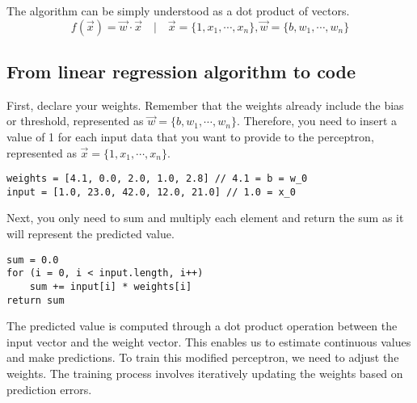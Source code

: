 The algorithm can be simply understood as a dot product of vectors.
\[
f(\vec{x}) = \vec{w} \cdot \vec{x} \quad | \quad \vec{x} = \{1, x_1, \cdots, x_n\},
\vec{w} = \{b, w_1, \cdots, w_n \}
\]

\subsection{From linear regression algorithm to code}
First, declare your weights. Remember that the weights already include the bias or threshold, represented
as $\vec{w} = \{b, w_1, \cdots, w_n\}$. Therefore, you need to insert a value of 1 for each input data that you
want to provide to the perceptron, represented as $\vec{x} = \{1, x_1, \cdots, x_n\}$.
\begin{verbatim}
weights = [4.1, 0.0, 2.0, 1.0, 2.8] // 4.1 = b = w_0
input = [1.0, 23.0, 42.0, 12.0, 21.0] // 1.0 = x_0
\end{verbatim}
Next, you only need to sum and multiply each element and return the sum as it will represent the predicted value.
\begin{verbatim}
sum = 0.0
for (i = 0, i < input.length, i++)
    sum += input[i] * weights[i]
return sum
\end{verbatim}
The predicted value is computed through a dot product operation between the input vector and the weight vector.
This enables us to estimate continuous values and make predictions. To train this modified perceptron, we need
to adjust the weights. The training process involves iteratively updating the weights based on prediction
errors. 
